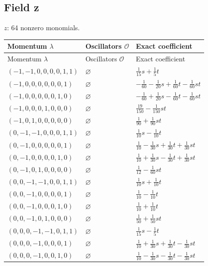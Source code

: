 \subsection{Field z}
$z$: 64 nonzero monomials.

\begingroup\scriptsize
\setlength{\tabcolsep}{5pt}
\begin{longtable}{@{}lll@{}}
\toprule
Momentum $\lambda$ & Oscillators $\mathcal O$ & Exact coefficient\\
\midrule\endfirsthead
\toprule
Momentum $\lambda$ & Oscillators $\mathcal O$ & Exact coefficient\\
\midrule\endhead
\bottomrule\endfoot
$(-1,-1,0,0,0,0,1,1)$ & $\varnothing$ & $\frac{1}{15}s+\frac{1}{5}t$\\
$(-1,0,0,0,0,0,0,1)$ & $\varnothing$ & $-\frac{1}{60}-\frac{1}{20}s+\frac{1}{60}t-\frac{1}{60}st$\\
$(-1,0,0,0,0,0,1,0)$ & $\varnothing$ & $-\frac{1}{60}+\frac{1}{20}s-\frac{1}{60}t-\frac{1}{60}st$\\
$(-1,0,0,0,1,0,0,0)$ & $\varnothing$ & $\frac{19}{150}-\frac{1}{150}st$\\
$(-1,0,1,0,0,0,0,0)$ & $\varnothing$ & $\frac{1}{90}+\frac{1}{90}st$\\
$(0,-1,-1,0,0,0,1,1)$ & $\varnothing$ & $\frac{1}{10}s-\frac{1}{10}t$\\
$(0,-1,0,0,0,0,0,1)$ & $\varnothing$ & $\frac{1}{10}-\frac{1}{30}s+\frac{1}{30}t+\frac{1}{30}st$\\
$(0,-1,0,0,0,0,1,0)$ & $\varnothing$ & $\frac{1}{10}+\frac{1}{30}s-\frac{1}{30}t+\frac{1}{30}st$\\
$(0,-1,0,1,0,0,0,0)$ & $\varnothing$ & $\frac{1}{12}-\frac{1}{60}st$\\
$(0,0,-1,-1,0,0,1,1)$ & $\varnothing$ & $\frac{1}{10}s+\frac{1}{10}t$\\
$(0,0,-1,0,0,0,0,1)$ & $\varnothing$ & $\frac{1}{10}-\frac{1}{10}t$\\
$(0,0,-1,0,0,0,1,0)$ & $\varnothing$ & $\frac{1}{10}+\frac{1}{10}t$\\
$(0,0,-1,0,1,0,0,0)$ & $\varnothing$ & $\frac{1}{50}+\frac{1}{50}st$\\
$(0,0,0,-1,-1,0,1,1)$ & $\varnothing$ & $\frac{1}{15}s-\frac{1}{5}t$\\
$(0,0,0,-1,0,0,0,1)$ & $\varnothing$ & $\frac{1}{10}+\frac{1}{30}s+\frac{1}{30}t-\frac{1}{30}st$\\
$(0,0,0,-1,0,0,1,0)$ & $\varnothing$ & $\frac{1}{10}-\frac{1}{30}s-\frac{1}{30}t-\frac{1}{30}st$\\

\end{longtable}
